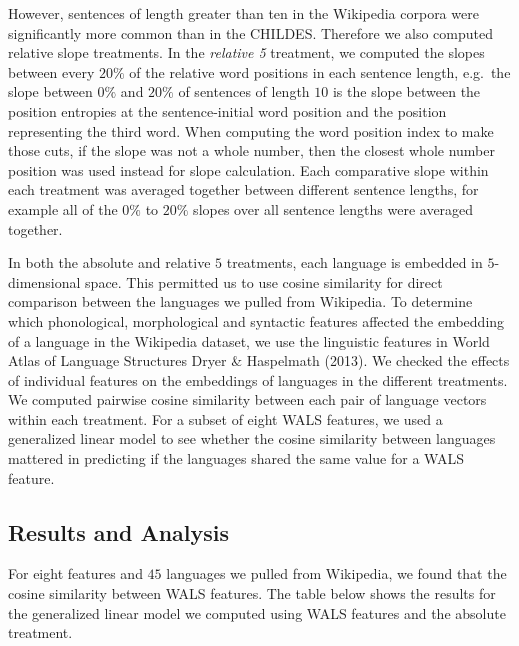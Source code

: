\documentclass[10pt, letterpaper]{article}
\begin{document}
However, sentences of length greater than ten in the Wikipedia corpora
were significantly more common than in the CHILDES. Therefore we also
computed relative slope treatments. In the \emph{relative 5} treatment,
we computed the slopes between every \(20\%\) of the relative word
positions in each sentence length, e.g.~the slope between \(0\%\) and
\(20\%\) of sentences of length \(10\) is the slope between the position
entropies at the sentence-initial word position and the position
representing the third word. When computing the word position index to
make those cuts, if the slope was not a whole number, then the closest
whole number position was used instead for slope calculation. Each
comparative slope within each treatment was averaged together between
different sentence lengths, for example all of the \(0\%\) to \(20\%\)
slopes over all sentence lengths were averaged together.

In both the absolute and relative \(5\) treatments, each language is
embedded in \(5\)-dimensional space. This permitted us to use cosine
similarity for direct comparison between the languages we pulled from
Wikipedia. To determine which phonological, morphological and syntactic
features affected the embedding of a language in the Wikipedia dataset,
we use the linguistic features in World Atlas of Language Structures
Dryer \& Haspelmath (2013). We checked the effects of individual
features on the embeddings of languages in the different treatments. We
computed pairwise cosine similarity between each pair of language
vectors within each treatment. For a subset of eight WALS features, we
used a generalized linear model to see whether the cosine similarity
between languages mattered in predicting if the languages shared the
same value for a WALS feature.

\hypertarget{results-and-analysis-2}{%
\subsection{Results and Analysis}\label{results-and-analysis-2}}

For eight features and \(45\) languages we pulled from Wikipedia, we
found that the cosine similarity between WALS features. The table below
shows the results for the generalized linear model we computed using
WALS features and the absolute treatment.
\end{document}
